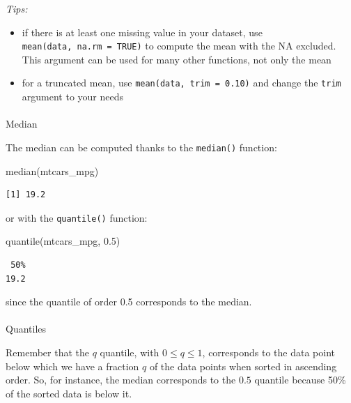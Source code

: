 \documentclass[
  letterpaper,
  DIV=11,
  numbers=noendperiod]{scrartcl}
\makeatletter
\let\oldparagraph\paragraph
\renewcommand{\paragraph}{
    \@ifstar
      \xxxParagraphStar
      \xxxParagraphNoStar
  }
\newcommand{\xxxParagraphStar}[1]{\oldparagraph*{#1}\mbox{}}
\newcommand{\xxxParagraphNoStar}[1]{\oldparagraph{#1}\mbox{}}
\newenvironment{Shaded}{\begin{snugshade}}{\end{snugshade}}
\newcommand{\FloatTok}[1]{\textcolor[rgb]{0.68,0.00,0.00}{#1}}
\newcommand{\FunctionTok}[1]{\textcolor[rgb]{0.28,0.35,0.67}{#1}}
\newcommand{\NormalTok}[1]{\textcolor[rgb]{0.00,0.23,0.31}{#1}}
\makeatother
\begin{document}
\emph{Tips:}

\begin{itemize}
\item
  if there is at least one missing value in your dataset, use
  \texttt{mean(data,\ na.rm\ =\ TRUE)} to compute the mean with the NA
  excluded. This argument can be used for many other functions, not only
  the mean
\item
  for a truncated mean, use \texttt{mean(data,\ trim\ =\ 0.10)} and
  change the \texttt{trim} argument to your needs
\end{itemize}

\paragraph{Median}\label{median}

The median can be computed thanks to the \texttt{median()} function:

\begin{Shaded}
\begin{Highlighting}[]
\FunctionTok{median}\NormalTok{(mtcars\_mpg)}
\end{Highlighting}
\end{Shaded}

\begin{verbatim}
[1] 19.2
\end{verbatim}

or with the \texttt{quantile()} function:

\begin{Shaded}
\begin{Highlighting}[]
\FunctionTok{quantile}\NormalTok{(mtcars\_mpg, }\FloatTok{0.5}\NormalTok{)}
\end{Highlighting}
\end{Shaded}

\begin{verbatim}
 50% 
19.2 
\end{verbatim}

since the quantile of order 0.5 corresponds to the median.

\paragraph{Quantiles}\label{quantiles}

Remember that the \(q\) quantile, with \(0\le q\le 1\), corresponds to
the data point below which we have a fraction \(q\) of the data points
when sorted in ascending order. So, for instance, the median corresponds
to the \(0.5\) quantile because 50\% of the sorted data is below it.
\end{document}
